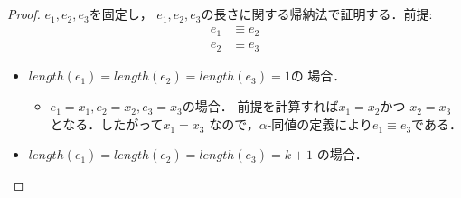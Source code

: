 \documentclass{ltjsbook}%
\begin{document}
\begin{proof}%
  $\mathit{e}_1^{},\mathit{e}_2^{},\mathit{e}_3^{}$を固定し，%
  $\mathit{e}_1^{},\mathit{e}_2^{},\mathit{e}_3^{}$の長さに関する帰納法で証明する．前提:%
  \begin{align}%
    \mathit{e}_1^{}&\equiv \mathit{e}_2^{}\\%
    \mathit{e}_2^{}&\equiv \mathit{e}_3^{}%
  \end{align}%
  \begin{itemize}%
  \item $length(\mathit{e}_1^{})=length(\mathit{e}_2^{})=length(\mathit{e}_3^{})=1$の%
    場合．%
  \begin{itemize}%
  \item $\mathit{e}_1^{}=\mathit{x}_1^{},\mathit{e}_2^{}=\mathit{x}_2^{},%
    \mathit{e}_3^{}=\mathit{x}_3^{}$の場合．%
    前提を計算すれば$\mathit{x}_1^{}=\mathit{x}_2^{}$かつ%
    $\mathit{x}_2^{}=\mathit{x}_3^{}$となる．したがって$\mathit{x}_1^{}=\mathit{x}_3^{}$%
    なので，$\alpha$-同値の定義により$\mathit{e}_1^{}\equiv \mathit{e}_3^{}$である．%
  \end{itemize}%
  \item $length(\mathit{e}_1^{})=length(\mathit{e}_2^{})=length(\mathit{e}_3^{})=k+1$%
  の場合．%
\end{itemize}
\end{proof}
\end{document}

